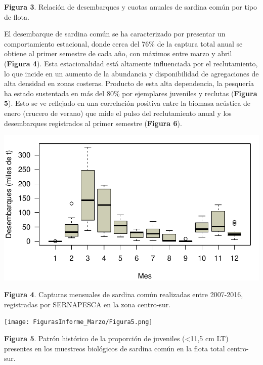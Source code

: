 \documentclass[
  spanish,
]{article}
\begin{document}
\vspace{-0.5cm}
\small

\textbf{Figura 3}. Relación de desembarques y cuotas anuales de sardina
común por tipo de flota. \vspace{0.5cm} \normalsize

El desembarque de sardina común se ha caracterizado por presentar un
comportamiento estacional, donde cerca del 76\% de la captura total
anual se obtiene al primer semestre de cada año, con máximos entre marzo
y abril (\textbf{Figura 4}). Esta estacionalidad está altamente
influenciada por el reclutamiento, lo que incide en un aumento de la
abundancia y disponibilidad de agregaciones de alta densidad en zonas
costeras. Producto de esta alta dependencia, la pesquería ha estado
sustentada en más del 80\% por ejemplares juveniles y reclutas
(\textbf{Figura 5}). Esto se ve reflejado en una correlación positiva
entre la biomasa acústica de enero (crucero de verano) que mide el pulso
del reclutamiento anual y los desembarques registrados al primer
semestre (\textbf{Figura 6}).

\begin{center}\includegraphics{FigurasInforme_Marzo/Fig4_ant-1} \end{center}

\small

\textbf{Figura 4}. Capturas mensuales de sardina común realizadas entre
2007-2016, registradas por SERNAPESCA en la zona centro-sur.
\vspace{0.5cm} \normalsize

\begin{center}
\texttt{[image: FigurasInforme\_Marzo/Figura5.png]}
\end{center}

\small

\textbf{Figura 5}. Patrón histórico de la proporción de juveniles
(\textless11,5 cm LT) presentes en los muestreos biológicos de sardina
común en la flota total centro-sur. \vspace{0.5cm}
\end{document}
